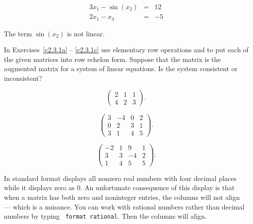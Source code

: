\documentclass{ximera}
\begin{document}
\begin{exercise} \label{c2.3.12e}
\[
\begin{array}{rcl}
3x_1  - \sin(x_2)  & = & 12\\
2x_1 -   x_3    & = & -5
\end{array}
\]
\begin{multipleChoice}
\end{multipleChoice}
\begin{hint}
  The term $\sin(x_2)$ is not linear.
\end{hint}
\end{exercise}

\CEXER



\noindent In Exercises~\ref{c2.3.1a} -- \ref{c2.3.1c} use elementary row
operations and \Matlab to put each of the given matrices into row echelon
form.  Suppose that the matrix is the augmented matrix for a system of
linear equations.  Is the system consistent or inconsistent?

\begin{exercise} \label{c2.3.1a}
\[
\left(\begin{array}{rrr}
 2 &  1  &  1   \\
 4 &  2  &  3
\end{array}\right).
\]
\end{exercise}
\begin{exercise} \label{c2.3.1b}
\[
\left(\begin{array}{rrrr}
 3  & -4 & 0 & 2\\
 0  &  2 & 3 & 1\\
 3  &  1 & 4 & 5
\end{array}\right).
\]
\end{exercise}
\begin{exercise} \label{c2.3.1c}
\[
\left(\begin{array}{rrrr}
 -2 & 1 &  9 & 1\\
  3 & 3 & -4 & 2\\
  1 & 4 &  5 & 5
\end{array}\right).
\]
\end{exercise}

 {\rm In standard format \Matlab displays
all nonzero real numbers with four decimal places while it displays
zero as $0$.  An unfortunate consequence of this display is that
when a matrix has both zero and noninteger entries, the columns
will not align --- which is a nuisance.  You can work with
rational numbers rather than decimal numbers by typing {\tt
format rational}.  Then the columns will align.}
\end{document}

